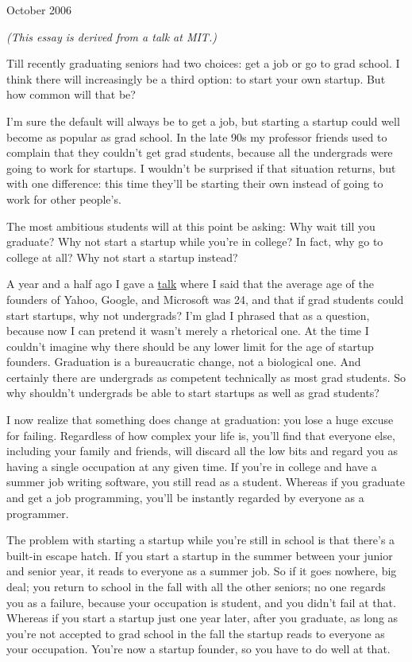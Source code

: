 October 2006

\emph{(This essay is derived from a talk at MIT.)}

Till recently graduating seniors had two choices: get a job or go to
grad school. I think there will increasingly be a third option: to start
your own startup. But how common will that be?

I'm sure the default will always be to get a job, but starting a startup
could well become as popular as grad school. In the late 90s my
professor friends used to complain that they couldn't get grad students,
because all the undergrads were going to work for startups. I wouldn't
be surprised if that situation returns, but with one difference: this
time they'll be starting their own instead of going to work for other
people's.

The most ambitious students will at this point be asking: Why wait till
you graduate? Why not start a startup while you're in college? In fact,
why go to college at all? Why not start a startup instead?

A year and a half ago I gave a \href{hiring.html}{talk} where I said
that the average age of the founders of Yahoo, Google, and Microsoft was
24, and that if grad students could start startups, why not undergrads?
I'm glad I phrased that as a question, because now I can pretend it
wasn't merely a rhetorical one. At the time I couldn't imagine why there
should be any lower limit for the age of startup founders. Graduation is
a bureaucratic change, not a biological one. And certainly there are
undergrads as competent technically as most grad students. So why
shouldn't undergrads be able to start startups as well as grad students?

I now realize that something does change at graduation: you lose a huge
excuse for failing. Regardless of how complex your life is, you'll find
that everyone else, including your family and friends, will discard all
the low bits and regard you as having a single occupation at any given
time. If you're in college and have a summer job writing software, you
still read as a student. Whereas if you graduate and get a job
programming, you'll be instantly regarded by everyone as a programmer.

The problem with starting a startup while you're still in school is that
there's a built-in escape hatch. If you start a startup in the summer
between your junior and senior year, it reads to everyone as a summer
job. So if it goes nowhere, big deal; you return to school in the fall
with all the other seniors; no one regards you as a failure, because
your occupation is student, and you didn't fail at that. Whereas if you
start a startup just one year later, after you graduate, as long as
you're not accepted to grad school in the fall the startup reads to
everyone as your occupation. You're now a startup founder, so you have
to do well at that.

